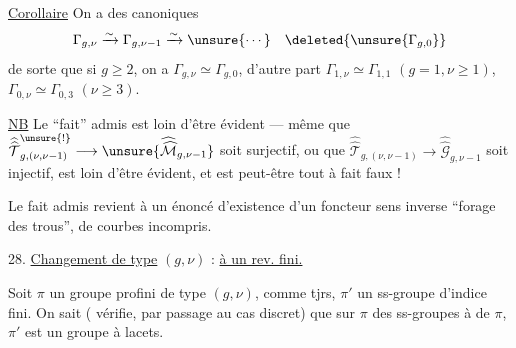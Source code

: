 \uline{Corollaire} On a des  canoniques
\[
\Gamma_{g,\nu}\xrightarrow{\sim}\Gamma_{g,\nu-1}\xrightarrow{\sim}\unsure{\cdots}\quad\deleted{\unsure{\Gamma_{g,0}}}
\]
de sorte que si $g\geq2$, on a  $\Gamma_{g,\nu}\simeq\Gamma_{g,0}$, d'autre part $\Gamma_{1,\nu}\simeq\Gamma_{1,1}$ $(g=1,\nu\geq1)$, $\Gamma_{0,\nu}\simeq\Gamma_{0,3}$ $(\nu\geq3)$.

\uline{NB} Le ``fait''  admis est loin d'être évident --- même que $\widehat{\widehat{\mathcal T}}^{\unsure{!}}_{g,(\nu,\nu-1)}\longrightarrow\unsure{\widehat{\widehat{\mathcal M}}_{g,\nu-1}}$ soit surjectif, ou que $\widehat{\widehat{\mathcal T}}_{g,(\nu,\nu-1)}\longrightarrow\widehat{\widehat{\mathcal G}}_{g,\nu-1}$ soit injectif, est loin d'être évident, et est peut-être tout à fait faux !

Le fait admis revient à un énoncé d'existence d'un foncteur  sens inverse ``forage des trous'',     de courbes  incompris.



28. \uline{Changement de type} $(g,\nu)$  : \uline{ à un rev. fini.}

Soit $\pi$ un groupe profini  de type $(g,\nu)$,  comme tjrs, $\pi'$ un ss-groupe d'indice fini. On sait ( vérifie, par passage au cas discret) que    sur $\pi$ des ss-groupes à  de $\pi$, $\pi'$ est un groupe à lacets.


